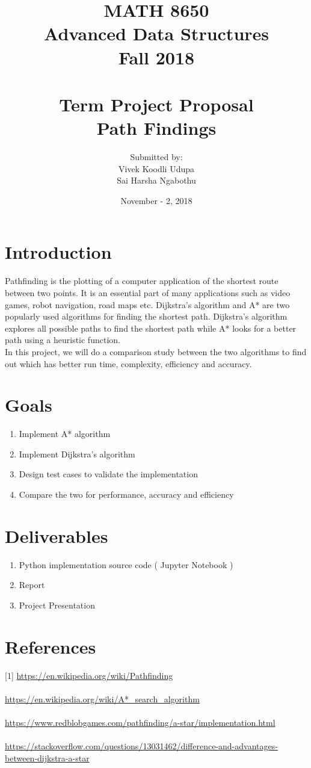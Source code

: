 \documentclass[12pt]{article}
\title{MATH 8650 \\ Advanced Data Structures \\ Fall 2018\\ \quad \\
	Term Project Proposal \\ Path Findings}
\author{Submitted by: 
\\ Vivek Koodli Udupa 
\\ Sai Harsha Ngabothu}
\date{November - 2, 2018 }
\begin{document}
\begin{mdframed}
\maketitle
\end{mdframed}

\section{Introduction}
Pathfinding is the plotting of a computer application of the shortest route between two points. It is an essential part of many applications such as video games, robot navigation, road maps etc. Dijkstra's algorithm and A* are two popularly used algorithms for finding the shortest path. Dijkstra's algorithm explores all possible paths to find the shortest path while A* looks for a better path using a heuristic function. \\
In this project, we will do a comparison study between the two algorithms to find out which has better run time, complexity, efficiency and accuracy. 
\section{Goals}
\begin{enumerate}
	\item Implement A* algorithm
	\item Implement Dijkstra's algorithm
	\item Design test cases to validate the implementation
	\item Compare the two for performance, accuracy and efficiency
\end{enumerate}

\section{Deliverables}
\begin{enumerate}
	\item Python implementation source code ( Jupyter Notebook )
	\item Report
	\item Project Presentation
\end{enumerate}

\section{References}
[1] \url{https://en.wikipedia.org/wiki/Pathfinding} \\
\\ \noindent 
[2] \url{https://en.wikipedia.org/wiki/A*_search_algorithm} \\
\\ \noindent
[3] \url{https://www.redblobgames.com/pathfinding/a-star/implementation.html} \\
\\ \noindent
[4] \url{https://stackoverflow.com/questions/13031462/difference-and-advantages-between-dijkstra-a-star}
\end{document}
